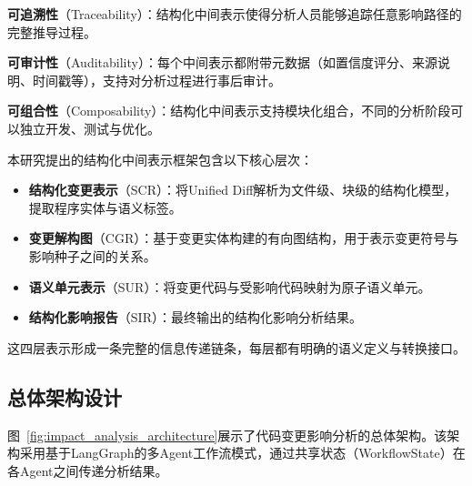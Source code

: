 \textbf{可追溯性}（Traceability）：结构化中间表示使得分析人员能够追踪任意影响路径的完整推导过程。

\textbf{可审计性}（Auditability）：每个中间表示都附带元数据（如置信度评分、来源说明、时间戳等），支持对分析过程进行事后审计。

\textbf{可组合性}（Composability）：结构化中间表示支持模块化组合，不同的分析阶段可以独立开发、测试与优化。

本研究提出的结构化中间表示框架包含以下核心层次：
\begin{itemize}
    \item \textbf{结构化变更表示}（SCR）：将Unified Diff解析为文件级、块级的结构化模型，提取程序实体与语义标签。
    \item \textbf{变更解构图}（CGR）：基于变更实体构建的有向图结构，用于表示变更符号与影响种子之间的关系。
    \item \textbf{语义单元表示}（SUR）：将变更代码与受影响代码映射为原子语义单元。
    \item \textbf{结构化影响报告}（SIR）：最终输出的结构化影响分析结果。
\end{itemize}

这四层表示形成一条完整的信息传递链条，每层都有明确的语义定义与转换接口。

\subsection{总体架构设计}
图~\ref{fig:impact_analysis_architecture}展示了代码变更影响分析的总体架构。该架构采用基于LangGraph的多Agent工作流模式，通过共享状态（WorkflowState）在各Agent之间传递分析结果。

